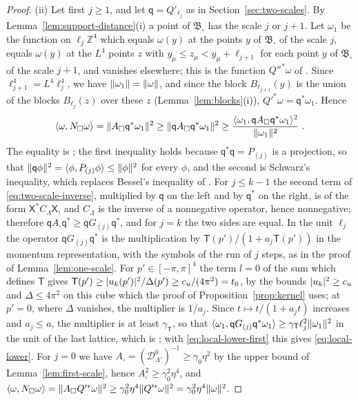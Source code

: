\documentclass[11pt]{preprint}
\DeclarePairedDelimiter{\abs}{\lvert}{\rvert}
\DeclarePairedDelimiter{\norm}{\lVert}{\rVert}
\numberwithin{equation}{section}
\theoremstyle{definition}
\theoremstyle{remark}
\theoremstyle{plain}
\begin{document}
\begin{proof}
(ii) Let first $j \geq 1$, and let $\mathsf q = Q'_{\ell_j}$ as in Section~\ref{sec:two-scales}. By Lemma~\ref{lem:support-distance}(i) a point of $\mathfrak B_\square$ has the scale $j$ or $j + 1$. Let $\omega_1$ be the function on $\ell_j\mathbb Z^4$ which equals $\omega(y)$ at the points $y$ of $\mathfrak B_\square$ of the scale $j$, equals $\omega(y)$ at the $L^4$ points $z$ with $y_\mu \leq z_\mu < y_\mu + \ell_{j+1}$ for each point $y$ of $\mathfrak B_\square$ of the scale $j + 1$, and vanishes elsewhere; this is the function $Q''^*\omega$ of \cite[p.~236]{BalabanPRT2}. Since $\ell_{j+1}^4 = L^4\ell_j^4$, we have $\norm{\omega_1} = \norm\omega$, and since the block $B_{\ell_{j+1}}(y)$ is the union of the blocks $B_{\ell_j}(z)$ over these $z$ (Lemma~\ref{lem:blocks}(i)), $Q'^*\omega = \mathsf q^*\omega_1$. Hence
\begin{equation}\label{eq:local-lower-first}
    \langle\omega, N_\square\omega\rangle = \norm{A_\square\mathsf q^*\omega_1}^2 \geq \norm{\mathsf qA_\square\mathsf q^*\omega_1}^2 \geq \frac{\langle\omega_1, \mathsf qA_\square\mathsf q^*\omega_1\rangle^2}{\norm{\omega_1}^2}\;.
\end{equation}
The equality is \cite[(2.71), (2.72)]{BalabanPRT2}; the first inequality holds because $\mathsf q^*\mathsf q = P_{(j)}$ is a projection, so that $\norm{\mathsf q\phi}^2 = \langle\phi, P_{(j)}\phi\rangle \leq \norm\phi^2$ for every $\phi$, and the second is Schwarz's inequality, which replaces Bessel's inequality of \cite[(2.73)]{BalabanPRT2}. For $j \leq k - 1$ the second term of \eqref{eq:two-scale-inverse}, multiplied by $\mathsf q$ on the left and by $\mathsf q^*$ on the right, is of the form $\mathsf X^*C_\Lambda\mathsf X$, and $C_\Lambda$ is the inverse of a nonnegative operator, hence nonnegative; therefore $\mathsf qA_\square\mathsf q^* \geq \mathsf qG_{(j)}\mathsf q^*$, and for $j = k$ the two sides are equal. In the unit $\ell_j$ the operator $\mathsf qG_{(j)}\mathsf q^*$ is the multiplication by $\mathsf T(p')/(1 + a_j\mathsf T(p'))$ in the momentum representation, with the symbols of the run of $j$ steps, as in the proof of Lemma~\ref{lem:one-scale}. For $p' \in [-\pi, \pi]^4$ the term $l = 0$ of the sum which defines $\mathsf T$ gives $\mathsf T(p') \geq \abs{u_k(p')}^2/\Delta(p') \geq c_u/(4\pi^2) = t_0$, by the bounds $\abs{u_k}^2 \geq c_u$ and $\Delta \leq 4\pi^2$ on this cube which the proof of Proposition~\ref{prop:kernel} uses; at $p' = 0$, where $\Delta$ vanishes, the multiplier is $1/a_j$. Since $t \mapsto t/(1 + a_jt)$ increases and $a_j \leq a$, the multiplier is at least $\gamma_{\mathsf T}$, so that $\langle\omega_1, \mathsf qG_{(j)}\mathsf q^*\omega_1\rangle \geq \gamma_{\mathsf T}\ell_j^2\norm{\omega_1}^2$ in the unit of the last lattice, which is \cite[(2.76)]{BalabanPRT2}; with \eqref{eq:local-lower-first} this gives \eqref{eq:local-lower}. For $j = 0$ we have $A_\square = (\mathcal D^0_{\Lambda'})^{-1} \geq \gamma_0\eta^2$ by the upper bound of Lemma~\ref{lem:first-scale}, hence $A_\square^2 \geq \gamma_0^2\eta^4$, and $\langle\omega, N_\square\omega\rangle = \norm{A_\square Q'^*\omega}^2 \geq \gamma_0^2\eta^4\norm{Q'^*\omega}^2 = \gamma_0^2\eta^4\norm\omega^2$.


\end{proof}
\end{document}
